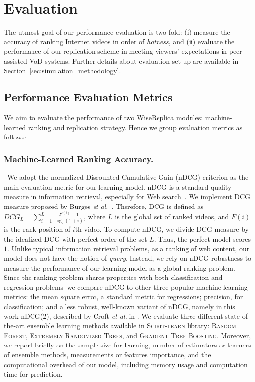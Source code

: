 \section{Evaluation}
\label{sec:evaluation}

The utmost goal of our performance evaluation is two-fold: (i) measure the accuracy of ranking Internet videos in order of \emph{hotness}, and (ii) evaluate the performance of our replication scheme in meeting viewers' expectations in peer-assisted VoD systems. Further details about evaluation set-up are available in Section~\ref{sec:simulation_methodology}.

\subsection{Performance Evaluation Metrics}
\label{subsec:methodology_metrics}

We aim to evaluate the performance of two WiseReplica modules: machine-learned ranking and replication strategy. Hence we group evaluation metrics as follows:

\subsubsection{Machine-Learned Ranking Accuracy.} 

\ We adopt the normalized Discounted Cumulative Gain (nDCG) criterion as the main evaluation metric for our learning model. nDCG is a standard quality measure in information retrieval, especially for Web search~\cite{jarvelin2002cumulated,manning2008introduction}. We implement DCG measure proposed by Burges \emph{et al.}~\cite{burges2005learning}. Therefore, DCG is defined as $DCG_{L}=\sum_{i=1}^L \frac{2^{F(i)}-1}{\log_{2}(1+i)}$, where $L$ is the global set of ranked videos, and $F(i)$ is the rank position of $i$th video. To compute nDCG, we divide DCG measure by the idealized DCG with perfect order of the set $L$. Thus, the perfect model scores $1$. Unlike typical information retrieval problems, as a ranking of web content, our model does not have the notion of \emph{query}. Instead, we rely on nDCG robustness to measure the performance of our learning model as a global ranking problem. Since the ranking problem shares properties with both classification and regression problems, we compare nDCG to other three popular machine learning metrics: the mean square error, a standard metric for regressions; precision, for classification; and a less robust, well-known variant of nDCG, namely  in this work nDCG(2), described by Croft \emph{et al.} in \cite{croft2010search}. We evaluate three different state-of-the-art ensemble learning methods available in \textsc{Scikit-learn} library: \textsc{Random Forest}, \textsc{Extremely Randomized Trees}, and \textsc{Gradient Tree Boosting}. Moreover, we report briefly on the sample size for learning, number of estimators or learners of ensemble methods, measurements or features importance, and the computational overhead of our model, including memory usage and computation time for prediction.

